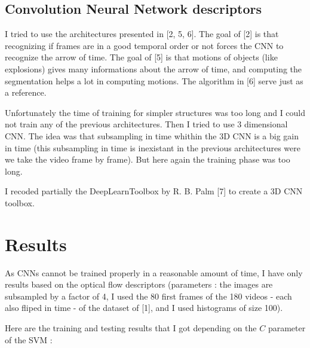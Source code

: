 \documentclass[10pt,a4paper]{report}
\begin{document}
		\subsection*{Convolution Neural Network descriptors}
		
		I tried to use the architectures presented in [2, 5, 6]. The goal of [2] is that recognizing if frames are in a good temporal order or not forces the CNN to recognize the arrow of time. The goal of [5] is that motions of objects (like explosions) gives many informations about the arrow of time, and computing the segmentation helps a lot in computing motions. The algorithm in [6] serve just as a reference.
		
		Unfortunately the time of training for simpler structures was too long and I could not train any of the previous architectures. Then I tried to use 3 dimensional CNN. The idea was that subsampling in time whithin the 3D CNN is a big gain in time (this subsampling in time is inexistant in the previous architectures were we take the video frame by frame). But here again the training phase was too long.
		
		I recoded partially the DeepLearnToolbox by R. B. Palm [7] to create a 3D CNN toolbox.
		
		\section*{Results}
		
			As CNNs cannot be trained properly in a reasonable amount of time, I have only results based on the optical flow descriptors (parameters : the images are subsampled by a factor of 4, I used the 80 first frames of the 180 videos - each also fliped in time - of the dataset of [1], and I used histograms of size 100).
			
			Here are the training and testing results that I got depending on the $C$ parameter of the SVM :
		
\end{document}
